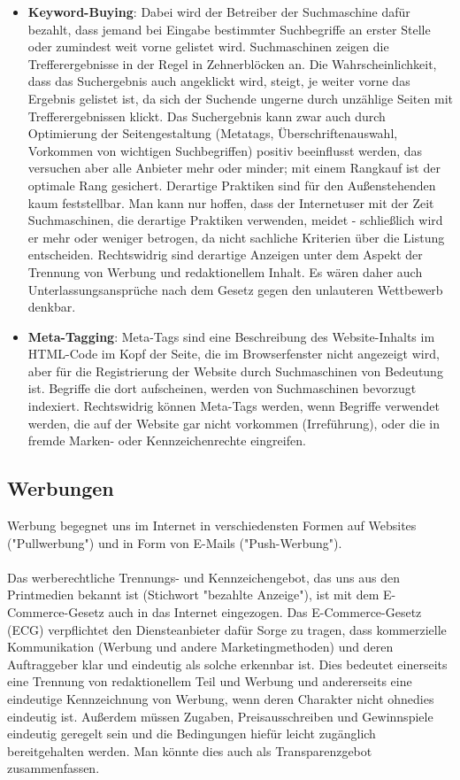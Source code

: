 \documentclass[a4paper]{article}
\begin{document}
\begin{itemize}
\item \textbf{Keyword-Buying}: Dabei wird der Betreiber der Suchmaschine dafür bezahlt, dass jemand bei Eingabe bestimmter Suchbegriffe an erster Stelle oder zumindest weit vorne gelistet wird. Suchmaschinen zeigen die Trefferergebnisse in der Regel in Zehnerblöcken an. Die Wahrscheinlichkeit, dass das Suchergebnis auch angeklickt wird, steigt, je weiter vorne das Ergebnis gelistet ist, da sich der Suchende ungerne durch unzählige Seiten mit Trefferergebnissen klickt. Das Suchergebnis kann zwar auch durch Optimierung der Seitengestaltung (Metatags, Überschriftenauswahl, Vorkommen von wichtigen Suchbegriffen) positiv beeinflusst werden, das versuchen aber alle Anbieter mehr oder minder; mit einem Rangkauf ist der optimale Rang gesichert. Derartige Praktiken sind für den Außenstehenden kaum feststellbar. Man kann nur hoffen, dass der Internetuser mit der Zeit Suchmaschinen, die derartige Praktiken verwenden, meidet - schließlich wird er mehr oder weniger betrogen, da nicht sachliche Kriterien über die Listung entscheiden. Rechtswidrig sind derartige Anzeigen unter dem Aspekt der Trennung von Werbung und redaktionellem Inhalt. Es wären daher auch Unterlassungsansprüche nach dem Gesetz gegen den unlauteren Wettbewerb denkbar.

\item \textbf{Meta-Tagging}: Meta-Tags sind eine Beschreibung des Website-Inhalts im HTML-Code im Kopf der Seite, die im Browserfenster nicht angezeigt wird, aber für die Registrierung der Website durch Suchmaschinen von Bedeutung ist. Begriffe die dort aufscheinen, werden von Suchmaschinen bevorzugt indexiert. Rechtswidrig können Meta-Tags werden, wenn Begriffe verwendet werden, die auf der Website gar nicht vorkommen (Irreführung), oder die in fremde Marken- oder Kennzeichenrechte eingreifen.

\end{itemize}

\subsection{Werbungen}

Werbung begegnet uns im Internet in verschiedensten Formen auf Websites ("Pullwerbung") und in Form von E-Mails ("Push-Werbung").\\\\
Das werberechtliche Trennungs- und Kennzeichengebot, das uns aus den Printmedien bekannt ist (Stichwort "bezahlte Anzeige"), ist mit dem E-Commerce-Gesetz auch in das Internet eingezogen. Das E-Commerce-Gesetz (ECG) verpflichtet den Diensteanbieter dafür Sorge zu tragen, dass kommerzielle Kommunikation (Werbung und andere Marketingmethoden) und deren Auftraggeber klar und eindeutig als solche erkennbar ist. Dies bedeutet einerseits eine Trennung von redaktionellem Teil und Werbung und andererseits eine eindeutige Kennzeichnung von Werbung, wenn deren Charakter nicht ohnedies eindeutig ist. Außerdem müssen Zugaben, Preisausschreiben und Gewinnspiele eindeutig geregelt sein und die Bedingungen hiefür leicht zugänglich bereitgehalten werden. Man könnte dies auch als Transparenzgebot zusammenfassen.
\end{document}
